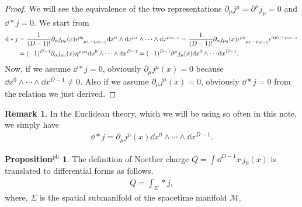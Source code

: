 \documentclass{article}
\theoremstyle{definition}
\newtheorem{propositionph}{Proposition$^\mathrm{ph}$}[section]
\newtheorem{remark}{Remark}[section]
\numberwithin{equation}{section}
\newcommand{\del}{\partial_\mu}
\begin{document}
\begin{proof}
  We will see the equivalence of the two representations $\del j^\mu = \partial^\mu j_\mu = 0$ and $\dd * j = 0$. We start from
  \begin{align}
    \dd * j
    &= \frac{1}{(D - 1)!}\partial_\alpha j_{\mu_0}(x)
      \tensor{\epsilon}{^{\mu_0}_{\mu_1\cdots\mu_{D-1}}} \dd x^{\alpha} \wedge \dd x^{\mu_1} \wedge \cdots \wedge \dd x^{\mu_{D-1}} = \frac{1}{(D - 1)!}\partial_\alpha j_{\mu_0}(x)
      \tensor{\epsilon}{^{\mu_0}_{\mu_1\cdots\mu_{D-1}}}\tensor{\epsilon}{^{\alpha\mu_1\cdots\mu_{D-1}}} \notag\\
    &= (-1)^{D-1}\partial_\alpha j_{\mu_0}(x)\eta^{{\mu_0}\alpha} \dd x^{0} \wedge \cdots \wedge \dd x^{D-1} = (-1)^{D-1}\partial^\mu j_\mu(x) \dd x^0 \wedge \cdots \dd x^{D-1}.
  \end{align}
  Now, if we assume $\dd * j = 0$, obviously $\partial_\mu j^\mu(x) = 0$ because $\dd x^0 \wedge \cdots \wedge \dd x^{D-1} \ne 0$. Also if we assume $\partial_\mu j^\mu(x) = 0$, obviously $\dd * j = 0$ from the relation we just derived.
\end{proof}

\begin{remark}
  In the Euclidean theory, which we will be using so often in this note, we simply have
  \begin{align}
    \dd * j = \del j^\mu(x) \dd x^0 \wedge \cdots \wedge \dd x^{D-1}.
  \end{align}
\end{remark}

\begin{propositionph}
  The definition of Noether charge ${\displaystyle Q = \int \dd^{D-1}x \, j_0(x)}$ is translated to differential forms as follows.
  \begin{align}
    Q = \int_\Sigma * j,
  \end{align}
  where, $\Sigma$ is the spatial submanifold of the spacetime manifold $\mathscr{M}$.
\end{propositionph}
\end{document}
